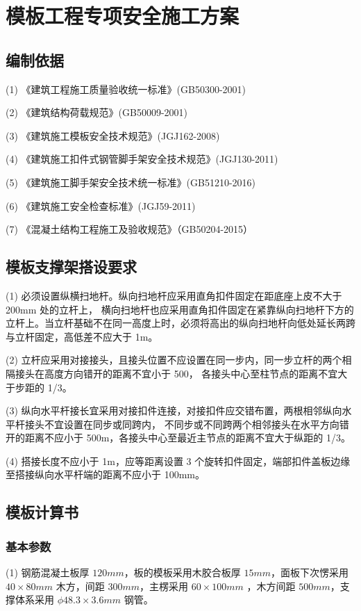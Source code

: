\section{模板工程专项安全施工方案}
\subsection{编制依据}

(1) 《建筑工程施工质量验收统一标准》(GB50300-2001)

(2) 《建筑结构荷载规范》(GB50009-2001)

(3) 《建筑施工模板安全技术规范》(JGJ162-2008)

(4) 《建筑施工扣件式钢管脚手架安全技术规范》(JGJ130-2011)

(5) 《建筑施工脚手架安全技术统一标准》(GB51210-2016)

(6) 《建筑施工安全检查标准》(JGJ59-2011)

(7) 《混凝土结构工程施工及验收规范》（GB50204-2015） 

\subsection{模板支撑架搭设要求}

(1) 必须设置纵横扫地杆。纵向扫地杆应采用直角扣件固定在距底座上皮不大于200mm 处的立杆上，
横向扫地杆也应采用直角扣件固定在紧靠纵向扫地杆下方的立杆上。当立杆基础不在同一高度上时，必须将高出的纵向扫地杆向低处延长两跨与立杆固定，高低差不应大于 1m。

(2) 立杆应采用对接接头，且接头位置不应设置在同一步内，同一步立杆的两个相隔接头在高度方向错开的距离不宜小于 500，
各接头中心至柱节点的距离不宜大于步距的 1/3。

(3) 纵向水平杆接长宜采用对接扣件连接，对接扣件应交错布置，两根相邻纵向水平杆接头不宜设置在同步或同跨内，
不同步或不同跨两个相邻接头在水平方向错开的距离不应小于 500m，各接头中心至最近主节点的距离不宜大于纵距的 1/3。

(4) 搭接长度不应小于 1m，应等距离设置 3 个旋转扣件固定，端部扣件盖板边缘至搭接纵向水平杆端的距离不应小于 100mm。

\subsection{模板计算书}
\subsubsection{基本参数}

(1) 钢筋混凝土板厚 $120mm$，板的模板采用木胶合板厚 $15mm$，面板下次愣采用 $40\times 80mm$ 木方，间距 $300mm$，主楞采用 $60\times 100mm$ ，木方间距 $500mm$，支撑体系采用 $\phi 48.3\times 3.6mm$ 钢管。

